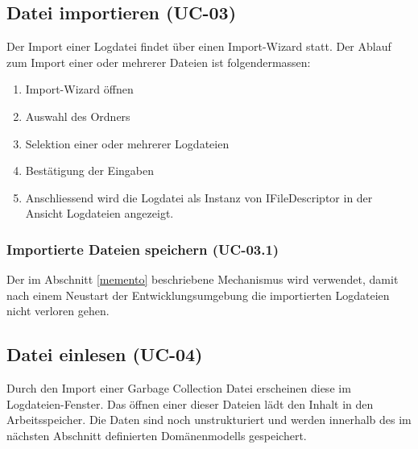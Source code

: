 \subsection{Datei importieren (UC-03)}
Der Import einer Logdatei findet über einen Import-Wizard statt. Der Ablauf zum Import einer oder mehrerer Dateien ist folgendermassen:
\begin{enumerate}
	\item Import-Wizard öffnen
	\item Auswahl des Ordners
	\item Selektion einer oder mehrerer Logdateien
	\item Bestätigung der Eingaben
	\item Anschliessend wird die Logdatei als Instanz von IFileDescriptor in der Ansicht Logdateien angezeigt.
\end{enumerate}

\subsubsection{Importierte Dateien speichern (UC-03.1)}
Der im Abschnitt \ref{memento} beschriebene Mechanismus wird verwendet, damit nach einem Neustart der Entwicklungsumgebung die importierten Logdateien nicht verloren gehen. 

\subsection{Datei einlesen (UC-04)}
Durch den Import einer Garbage Collection Datei erscheinen diese im Logdateien-Fenster. Das öffnen einer dieser Dateien lädt den Inhalt in den Arbeitsspeicher. Die Daten sind noch unstrukturiert und werden innerhalb des im nächsten Abschnitt definierten Domänenmodells gespeichert.

